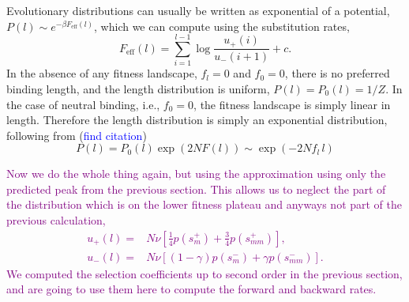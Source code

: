 \documentclass[10pt,a4paper]{article}
\begin{document}
{Evolutionary distributions can usually be written as exponential of a potential, $P(l)\sim e^{-\beta F_\mathrm{eff}(l)}$, which we can compute using the substitution rates,
\begin{equation}
	F_\mathrm{eff}(l)=\sum_{i=1}^{l-1}\log\frac{u_+(i)}{u_-(i+1)}+c.
\end{equation}
In the absence of any fitness landscape, $f_l=0$ and $f_0=0$, there is no preferred binding length, and the length distribution is uniform, $P(l)=P_0(l)=1/Z$. In the case of neutral binding, i.e., $f_0=0$, the fitness landscape is simply linear in length. Therefore the length distribution is simply an exponential distribution, following from (\textcolor{blue}{find citation})
\begin{equation}
	P(l)=P_0(l)\exp(2NF(l))\sim \exp(-2Nf_l\,l)
\end{equation}

\vspace{3cm}
\textcolor{purple}{Now we do the whole thing again, but using the approximation using only the predicted peak from the previous section. This allows us to neglect the part of the distribution which is on the lower fitness plateau and anyways not part of the previous calculation,
\begin{align}
u_+(l)=&N\nu \left[ \frac{1}{4} p\left(s^+_m \right) + \frac{3}{4} p\left(s^+_{mm} \right) \right], \label{equ:up_rate2}\\
u_-(l)=&N\nu\left[(1-\gamma) p\left(s^-_m \right) + \gamma p\left(s^-_{mm}\right)\right].\label{equ:down_rate2}
\end{align}
We computed the selection coefficients up to second order in the previous section, and are going to use them here to compute the forward and backward rates.
}
}
\end{document}
